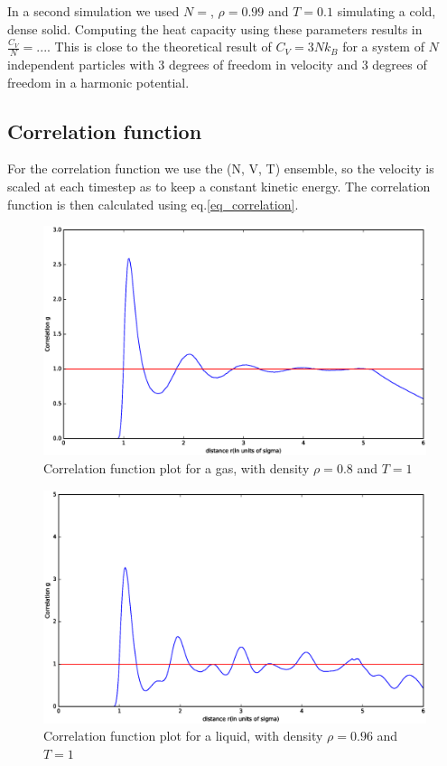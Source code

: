 \documentclass[twoside]{article}
\begin{document}
	In a second simulation we used $N=$, $\rho=0.99$ and $T=0.1$ simulating a cold, dense solid. Computing the heat capacity using these parameters results in $\frac{C_V}{N} = ... $. This is close to the theoretical result of $C_V = 3 N k_B$ for a system of $N$ independent particles with 3 degrees of freedom in velocity and 3 degrees of freedom in a harmonic potential.
	
	\subsection{Correlation function}
	For the correlation function we use the (N, V, T) ensemble, so the velocity is scaled at each timestep as to keep a constant kinetic energy. The correlation function is then calculated using eq.\ref{eq_correlation}. 
\begin{figure}
\centering
\includegraphics[width=0.7\linewidth]{figure_corr_gas.eps}
\caption{Correlation function plot for a gas, with density $\rho = 0.8$ and $T = 1$}
\label{fig:figure_corr_gas}
\end{figure}

\begin{figure}
	\centering
	\includegraphics[width=0.7\linewidth]{figure_corr_liquid.eps}
	\caption{Correlation function plot for a liquid, with density $\rho = 0.96$ and $T = 1$}
	\label{fig:figure_corr_gas}
\end{figure}
\end{document}
